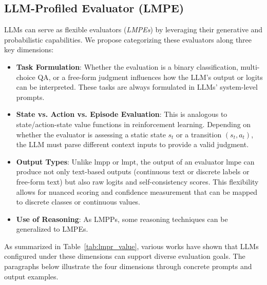 

\subsection{LLM-Profiled Evaluator (LMPE)}
\label{sec:evaluators}
LLMs can serve as flexible evaluators (\textit{LMPEs}) by leveraging their generative and probabilistic capabilities. We propose categorizing these evaluators along three key dimensions: 
\begin{itemize} 
\item \textbf{Task Formulation}: Whether the evaluation is a binary classification, multi-choice QA, or a free-form judgment influences how the LLM’s output or logits can be interpreted. These tasks are always formulated in LLMs' system-level prompts. 

\item \textbf{State vs. Action vs. Episode Evaluation}: This is analogous to state/action-state value functions in reinforcement learning. Depending on whether the evaluator is assessing a static state $s_t$ or a transition $(s_t, a_t)$, the LLM must parse different context inputs to provide a valid judgment. 

\item \textbf{Output Types}: Unlike $\text{lmpp}$ or $\text{lmpt}$, the output of an evaluator $\text{lmpe}$ can produce not only text-based outputs (continuous text or discrete labels or free-form text) but also raw logits and self-consistency scores. This flexibility allows for nuanced scoring and confidence measurement that can be mapped to discrete classes or continuous values. 

\item \textbf{Use of Reasoning}: As LMPPs, some reasoning techniques can be generalized to LMPEs.
\end{itemize} 
As summarized in Table~\ref{tab:lmpr_value}, various works have shown that LLMs configured under these dimensions can support diverse evaluation goals. 
The paragraphs below illustrate the four dimensions through concrete prompts and output examples.

